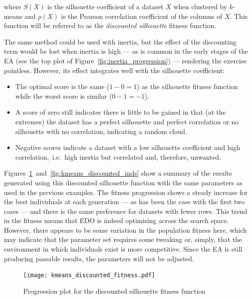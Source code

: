 \noindent where \(S(X)\) is the silhouette coefficient of a dataset \(X\) when
clustered by \(k\)-means and \(\rho(X)\) is the Pearson correlation coefficient
of the columns of \(X\). This function will be referred to as the
\emph{discounted silhouette} fitness function. 

The same method could be used with inertia, but the effect of the discounting
term would be lost when inertia is high --- as is common in the early stages of
the EA (see the top plot of Figure~\ref{fig:inertia_progression}) --- rendering
the exercise pointless. However, its effect integrates well with the silhouette
coefficient:

\begin{itemize}
    \item The optimal score is the same (\(1 - 0 = 1\)) as the silhouette
        fitness function while the worst score is similar (\(0-1=-1\)).
    \item A score of zero still indicates there is little to be gained in that
        (at the extremes) the dataset has a perfect silhouette and perfect
        correlation or no silhouette with no correlation, indicating a random
        cloud.
    \item Negative scores indicate a dataset with a low silhouette coefficient
        and high correlation,~i.e.\ high inertia but correlated and, therefore,
        unwanted.
\end{itemize}

Figures~\ref{fig:discounted_progression}~and~\ref{fig:kmeans_discounted_inds}
show a summary of the results generated using this discounted silhouette
function with the same parameters as used in the previous examples. The fitness
progression shows a steady increase for the best individuals at each generation
--- as has been the case with the first two cases --- and there is the same
preference for datasets with fewer rows. This trend in the fitness means that
EDO is indeed optimising across the search space. However,
there appears to be some variation in the population fitness here, which may
indicate that the parameter set requires some tweaking or, simply, that the
environment in which individuals exist is more competitive. Since the
EA is still producing passable results, the parameters will not be adjusted.

\begin{figure}
    \centering
    \texttt{[image: kmeans\_discounted\_fitness.pdf]}%
    \caption{%
        Progression plot for the discounted silhouette fitness function
    }\label{fig:discounted_progression}
\end{figure}

